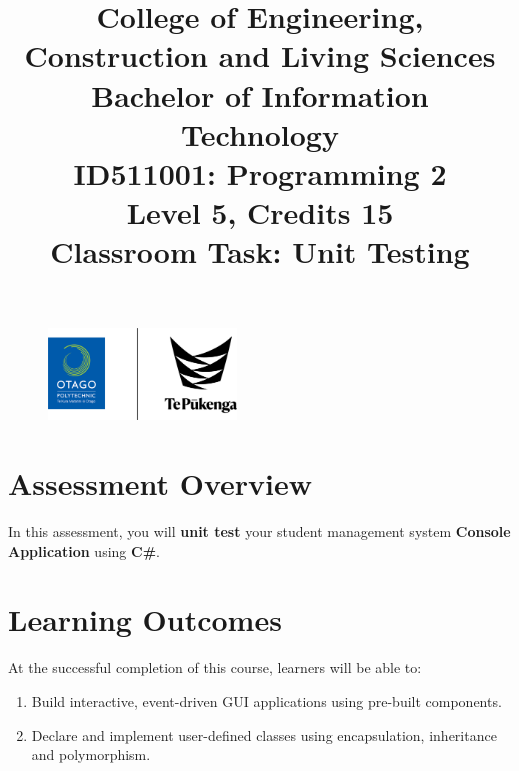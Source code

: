 \documentclass{article}
\author{}
\begin{document}
\begin{figure}
    \centering
    \includegraphics[width=50mm]{../../resources/img/logo.png}
\end{figure}

\title{College of Engineering, Construction and Living Sciences\\Bachelor of Information Technology\\ID511001: Programming 2\\Level 5, Credits 15\\\textbf{Classroom Task: Unit Testing}}
\date{}
\maketitle

\section*{Assessment Overview}
In this assessment, you will \textbf{unit test} your student management system \textbf{Console Application} using \textbf{C\#}. 

\section*{Learning Outcomes}
At the successful completion of this course, learners will be able to:
\begin{enumerate}
    \item Build interactive, event-driven GUI applications using pre-built components.
    \item Declare and implement user-defined classes using encapsulation, inheritance and polymorphism.
\end{enumerate}
\end{document}
